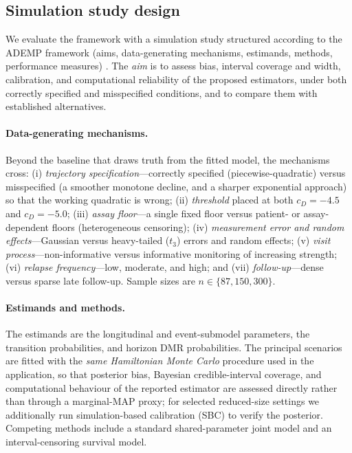 \documentclass[11pt]{article}
\begin{document}
\subsection{Simulation study design}
\label{sec:sim}

We evaluate the framework with a simulation study structured according to the
ADEMP framework (aims, data-generating mechanisms, estimands, methods,
performance measures) \cite{GneitingRaftery2007ProperScoring}. The
\emph{aim} is to assess bias, interval coverage and width, calibration, and
computational reliability of the proposed estimators, under both correctly
specified and misspecified conditions, and to compare them with established
alternatives.

\paragraph{Data-generating mechanisms.} Beyond the baseline that draws truth
from the fitted model, the mechanisms cross: (i) \emph{trajectory
specification}---correctly specified (piecewise-quadratic) versus misspecified
(a smoother monotone decline, and a sharper exponential approach) so that the
working quadratic is wrong; (ii) \emph{threshold} placed at both $c_D=-4.5$ and
$c_D=-5.0$; (iii) \emph{assay floor}---a single fixed floor versus
patient- or assay-dependent floors (heterogeneous censoring); (iv)
\emph{measurement error and random effects}---Gaussian versus heavy-tailed
($t_3$) errors and random effects; (v) \emph{visit process}---non-informative
versus informative monitoring of increasing strength; (vi) \emph{relapse
frequency}---low, moderate, and high; and (vii) \emph{follow-up}---dense versus
sparse late follow-up. Sample sizes are $n\in\{87,150,300\}$.

\paragraph{Estimands and methods.} The estimands are the longitudinal and
event-submodel parameters, the transition probabilities, and horizon DMR
probabilities. The principal scenarios are fitted with the \emph{same
Hamiltonian Monte Carlo} procedure used in the application, so that posterior
bias, Bayesian credible-interval coverage, and computational behaviour of the
reported estimator are assessed directly rather than through a marginal-MAP
proxy; for selected reduced-size settings we additionally run
simulation-based calibration (SBC) to verify the posterior. Competing methods
include a standard shared-parameter joint model and an interval-censoring
survival model.
\end{document}
